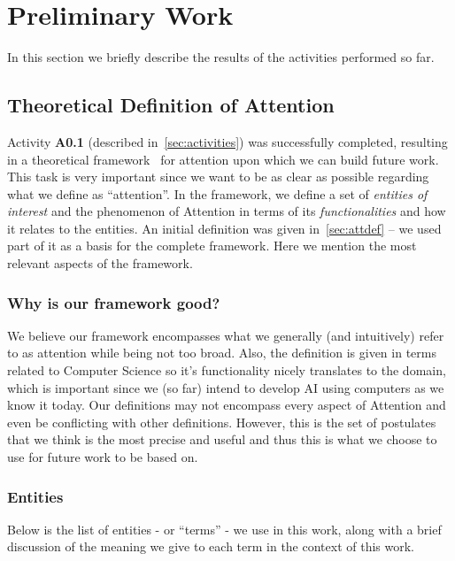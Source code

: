 \documentclass[12pt]{article}
\begin{document}
\section{Preliminary Work}
In this section we briefly describe the results of the activities performed so far.

\subsection{Theoretical Definition of Attention}
Activity \textbf{A0.1} (described in~\ref{sec:activities}) was successfully completed,
resulting in a theoretical framework~\cite{ref:framework} for attention upon which we can build future work.
This task is very important since we want to be as clear as possible regarding what we define as ``attention''.
In the framework, we define a set of \emph{entities of interest} and the phenomenon of Attention in terms of
its \emph{functionalities} and how it relates to the entities.
An initial definition was given in~\ref{sec:attdef} -- we used part of it as a basis for the complete framework.
Here we mention the most relevant aspects of the framework.

\subsubsection{Why is our framework good?}
We believe our framework encompasses what we generally (and intuitively) refer to as attention while being not too broad.
Also, the definition is given in terms related to Computer Science so it’s functionality nicely translates to the domain,
which is important since we (so far) intend to develop AI using computers as we know it today.
Our definitions may not encompass every aspect of Attention and even be conflicting with other definitions.
However, this is the set of postulates that we think is the most precise and useful and thus this is
what we choose to use for future work to be based on.

\subsubsection{Entities}
Below is the list of entities - or “terms” - we use in this work, along with a brief discussion of the meaning
we give to each term in the context of this work.
\end{document}
